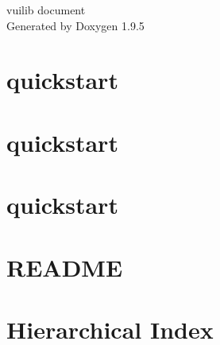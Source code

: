 \documentclass[twoside]{book}
\newcommand{\+}{\discretionary{\mbox{\scriptsize$\hookleftarrow$}}{}{}}
\newcommand{\clearemptydoublepage}{%
    \newpage{\pagestyle{empty}\cleardoublepage}%
  }
\begin{document}
  \raggedbottom
    \hypersetup{pageanchor=false,
                bookmarksnumbered=true,
                pdfencoding=unicode
               }
  \begin{titlepage}
  \vspace*{7cm}
  \begin{center}%
  {\Large vuilib document}\\
  \vspace*{1cm}
  {\large Generated by Doxygen 1.9.5}\\
  \end{center}
  \end{titlepage}
  \clearemptydoublepage
  \tableofcontents
  \clearemptydoublepage
  \hypersetup{pageanchor=true}
\chapter{quickstart}
\label{md__g___vue_lib_vuilib_cmake_doc_vml_quickstart}

\chapter{quickstart}
\label{md__g___vue_lib_vuilib_cmake_doc_vss_quickstart}

\chapter{quickstart}
\label{md__g___vue_lib_vuilib_cmake_doc_vwidget_quickstart}

\chapter{README}
\label{md__g___vue_lib_vuilib_cmake__r_e_a_d_m_e}

\chapter{Hierarchical Index}

\end{document}
